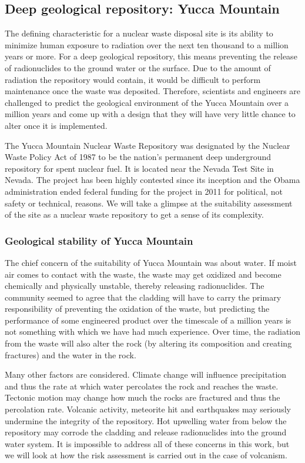 \documentclass[nofootinbib,preprint,aip,pra]{revtex4-1}
\begin{document}
    \subsection{Deep geological repository: Yucca Mountain}
        The defining characteristic for a nuclear waste disposal site is its ability to minimize human
        exposure to radiation over the next ten thousand to a million years or more.
        For a deep geological repository, this means preventing the release
        of radionuclides to the ground water or the surface.
        Due to the amount of radiation the repository would contain, it would be difficult to perform
        maintenance once the waste was deposited. Therefore, scientists and engineers are challenged
        to predict the geological environment of the Yucca Mountain over a million years and come up
        with a design that they will have very little chance to alter once it is implemented.

        The Yucca Mountain Nuclear Waste Repository was designated by the Nuclear Waste Policy Act
        of 1987 to be the nation's permanent deep underground repository for spent nuclear fuel. It is
        located near the Nevada Test Site in Nevada. The project has been highly contested since its
        inception and the Obama administration ended federal funding for the project in 2011 for political,
        not safety or technical, reasons. We will take a glimpse at the suitability assessment of the site
        as a nuclear waste repository to get a sense of its complexity.
        \subsubsection{Geological stability of Yucca Mountain}
        The chief concern of the suitability of Yucca Mountain was about water. If moist air comes to
        contact with the waste, the waste may get oxidized and become chemically and physically unstable, thereby
        releasing radionuclides.
        The community seemed to agree that the cladding will have to carry the primary
        responsibility of preventing the oxidation of the waste, but predicting the performance of some
        engineered product over the timescale of a million years is not something with which we have had much 
        experience. Over time, the radiation from the waste will also alter the rock (by altering its composition
        and creating fractures) and the water in the rock.\cite{m06}

        Many other factors are considered. Climate change will influence precipitation and thus the
        rate at which water percolates the rock and reaches the waste. 
        Tectonic motion may change how much the rocks are fractured and thus the percolation rate.
        Volcanic activity, meteorite hit and earthquakes may seriously undermine the integrity of the repository.
        Hot upwelling water from below the repository may corrode the cladding and release radionuclides into
        the ground water system. It is impossible to address all of these concerns in this work, but we will look
        at how the risk assessment is carried out in the case of volcanism.
\end{document}
